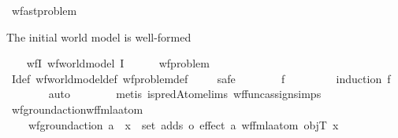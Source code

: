 \begin{isabellebody}
{}\isanewline
\isanewline
{}\isamarkupfalse%
\ wf{\isacharunderscore}{\kern0pt}ast{\isacharunderscore}{\kern0pt}problem\ %
\begin{isamarkuptext}%
The initial world model is well-formed%
\end{isamarkuptext}\isamarkuptrue%
\ \ \isamarkupfalse%
\ wf{\isacharunderscore}{\kern0pt}I{\isacharcolon}{\kern0pt}\ {\isachardoublequoteopen}wf{\isacharunderscore}{\kern0pt}world{\isacharunderscore}{\kern0pt}model\ I{\isachardoublequoteclose}\isanewline
%
\isadelimproof
\ \ \ \ %
\endisadelimproof
%
\isatagproof
{}\isamarkupfalse%
\ wf{\isacharunderscore}{\kern0pt}problem\isanewline
\ \ \ \ \isamarkupfalse%
\ I{\isacharunderscore}{\kern0pt}def\ wf{\isacharunderscore}{\kern0pt}world{\isacharunderscore}{\kern0pt}model{\isacharunderscore}{\kern0pt}def\ wf{\isacharunderscore}{\kern0pt}problem{\isacharunderscore}{\kern0pt}def\isanewline
\ \ \ \ \isamarkupfalse%
{\isacharparenleft}{\kern0pt}safe{\isacharparenright}{\kern0pt}\ \isanewline
\ \ \ \ \isamarkupfalse%
\ \ f\ \isanewline
\ \ \ \ \ \ \isamarkupfalse%
\ {\isacharparenleft}{\kern0pt}induction\ f{\isacharparenright}{\kern0pt}\ \isanewline
\ \ \ \ \ \ \isamarkupfalse%
\ auto\isanewline
\ \ \ \ \ \ \isamarkupfalse%
\ {\isacharparenleft}{\kern0pt}metis\ is{\isacharunderscore}{\kern0pt}predAtom{\isachardot}{\kern0pt}elims{\isacharparenleft}{\kern0pt}{}{\isacharparenright}{\kern0pt}\ wf{\isacharunderscore}{\kern0pt}func{\isacharunderscore}{\kern0pt}assign{\isachardot}{\kern0pt}simps{\isacharparenleft}{\kern0pt}{}{\isacharparenright}{\kern0pt}{\isacharparenright}{\kern0pt}\isanewline
\ \ \ \ \isamarkupfalse%
%
\endisatagproof
{\isafoldproof}%
%
\isadelimproof
\isanewline
%
\endisadelimproof
\isanewline
\ \ \isanewline
\ \ \isamarkupfalse%
\ wf{\isacharunderscore}{\kern0pt}ground{\isacharunderscore}{\kern0pt}action{\isacharunderscore}{\kern0pt}wf{\isacharunderscore}{\kern0pt}fmla{\isacharunderscore}{\kern0pt}atom{\isacharcolon}{\kern0pt}\ \isanewline
\ \ \ \ {\isachardoublequoteopen}wf{\isacharunderscore}{\kern0pt}ground{\isacharunderscore}{\kern0pt}action\ a\ {\isasymLongrightarrow}\ {\isasymforall}x\ {\isasymin}\ set\ {\isacharparenleft}{\kern0pt}{\isacharparenleft}{\kern0pt}adds\ o\ effect{\isacharparenright}{\kern0pt}\ a{\isacharparenright}{\kern0pt}{\isachardot}{\kern0pt}\ wf{\isacharunderscore}{\kern0pt}fmla{\isacharunderscore}{\kern0pt}atom\ objT\ x{\isachardoublequoteclose}\isanewline

\end{isabellebody}
